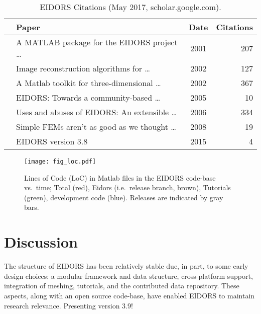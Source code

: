 \documentclass[10pt,letterpaper]{article}
\begin{document}
\begin{multicols}{2}
\begin{table}[H]
  \footnotesize
\centering
\caption{\label{tbl:cite} EIDORS Citations
 (May 2017, scholar.google.com).
}
\begin{tabular}{r@{\hspace{1mm}}lcr}
  \toprule
  & Paper & Date & \hspace{-2mm}Citations \\
  \midrule
  \cite{vauhkonen2001} & A MATLAB package for the EIDORS project \ldots\hspace{-5mm}  
    & 2001 & 207 \\
  \cite{polydorides2002phd} & Image reconstruction algorithms for \ldots
    & 2002 & 127 \\
  \cite{polydorides2002matlab} & A Matlab toolkit for three-dimensional \ldots
    & 2002 & 367 \\
  \cite{adler2005} & EIDORS: Towards a community-based \ldots
    & 2005 & 10 \\
  \cite{adler2006} & Uses and abuses of {EIDORS}: An extensible \ldots
    & 2006 & 334 \\
  \cite{adler2008} & Simple FEMs aren't as good as we thought \ldots
    & 2008 &  19 \\
  \cite{adler2015} & EIDORS version 3.8
    & 2015 & 4 \\
  \bottomrule
\end{tabular}
\vspace{-1em}
\end{table}

\begin{figure}[H]
  \vspace{-2.5mm}
\centering
 \texttt{[image: fig\_loc.pdf]}
\caption{\label{fig:loc}%
  Lines of Code (LoC) in Matlab files in the EIDORS code-base vs.\ time; Total
   (red), Eidors (i.e.\ release branch, brown), Tutorials (green), development code (blue).
   Releases are indicated by gray bars.
}
\end{figure}

\section{Discussion}
The structure of EIDORS has been relatively stable due, in part, to some early design choices:
a modular framework and data structure,
cross-platform support, integration of meshing,
tutorials, and the contributed data repository.
These aspects, along with an open source code-base, have enabled EIDORS to
maintain research relevance.
Presenting version 3.9!



\end{multicols}
\end{document}
